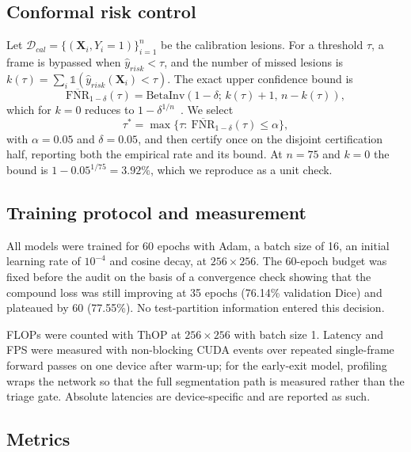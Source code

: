 \documentclass[journal]{IEEEtran}
\begin{document}
\subsection{Conformal risk control}

Let $\mathcal{D}_{cal}=\{(\mathbf{X}_i,Y_i=1)\}_{i=1}^{n}$ be the calibration lesions. For a threshold $\tau$, a frame is bypassed when $\hat{y}_{risk}<\tau$, and the number of missed lesions is $k(\tau)=\sum_i\mathbb{1}(\hat{y}_{risk}(\mathbf{X}_i)<\tau)$. The exact upper confidence bound is
\begin{equation}
\overline{\mathrm{FNR}}_{1-\delta}(\tau)=\mathrm{BetaInv}\!\left(1-\delta;\,k(\tau)+1,\,n-k(\tau)\right),
\end{equation}
which for $k=0$ reduces to $1-\delta^{1/n}$~\cite{clopper1934}. We select
\begin{equation}
\tau^{*}=\max\{\tau:\ \overline{\mathrm{FNR}}_{1-\delta}(\tau)\le \alpha\},
\end{equation}
with $\alpha=0.05$ and $\delta=0.05$, and then certify once on the disjoint certification half, reporting both the empirical rate and its bound. At $n=75$ and $k=0$ the bound is $1-0.05^{1/75}=3.92\%$, which we reproduce as a unit check.

\subsection{Training protocol and measurement}

All models were trained for 60 epochs with Adam, a batch size of 16, an initial learning rate of $10^{-4}$ and cosine decay, at $256\times256$. The 60-epoch budget was fixed before the audit on the basis of a convergence check showing that the compound loss was still improving at 35 epochs (76.14\% validation Dice) and plateaued by 60 (77.55\%). No test-partition information entered this decision.

FLOPs were counted with ThOP at $256\times256$ with batch size 1. Latency and FPS were measured with non-blocking CUDA events over repeated single-frame forward passes on one device after warm-up; for the early-exit model, profiling wraps the network so that the full segmentation path is measured rather than the triage gate. Absolute latencies are device-specific and are reported as such.

\subsection{Metrics}
\end{document}
